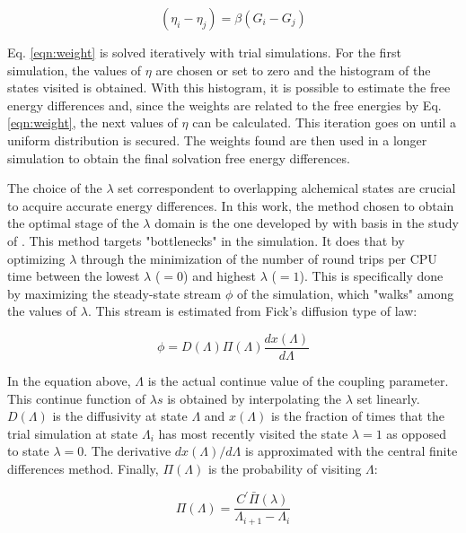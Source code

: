 	\begin{equation}
	(\eta_{i} - \eta_{j}) = \beta(G_i-G_j)
	\label{eqn:weight}
	\end{equation}
	
	Eq. \eqref{eqn:weight} is solved iteratively with trial simulations. For the first simulation, the values of $\eta$ are chosen or set to zero and the histogram of the states visited is obtained. With this histogram, it is possible to estimate the free energy differences and, since the weights are related to the free energies by Eq. \eqref{eqn:weight}, the next values of $\eta$ can be calculated. This iteration goes on until a uniform distribution is secured. The weights found are then used in a longer simulation to obtain the final solvation free energy differences.
	
	The choice of the $\lambda$ set correspondent to overlapping alchemical states are crucial to acquire accurate energy differences. In this work, the method chosen to obtain the optimal stage of the $\lambda$ domain is the one developed by  with basis in the study of  . This method targets "bottlenecks" in the simulation. It does that by optimizing $\lambda$ through the minimization of the number of round trips per CPU time between the lowest $\lambda$ ($=0$) and highest $\lambda$ ($=1$). This is specifically done by maximizing the steady-state stream $\phi$ of the simulation, which "walks" among the values of $\lambda$. This stream is estimated from Fick's diffusion type of law:
	
	\begin{equation}
	\phi = D(\Lambda) \Pi (\Lambda) \dfrac{dx(\Lambda)}{d \Lambda}
	\label{eqn:stream}
	\end{equation}
	
	In the equation above, $\Lambda$ is the actual continue value of the coupling parameter. This continue function of $\lambda s$ is obtained by interpolating the $\lambda$ set linearly. $D(\Lambda)$ is the diffusivity at  state $\Lambda$ and $x(\Lambda)$ is the fraction of times that the trial simulation at state $\Lambda_{i}$ has most recently visited the state $\lambda=1$ as opposed to state $\lambda=0$. The derivative ${dx(\Lambda)}/{d \Lambda}$ is approximated with the central finite differences method. Finally, $\Pi (\Lambda)$ is the probability of visiting $\Lambda$:
	
	\begin{equation}
	\Pi (\Lambda) = \dfrac{C^{'} \bar{\Pi} (\lambda)}{\Lambda_{i+1} - \Lambda_{i}}
	\label{eqn:plambda}
	\end{equation}
	
